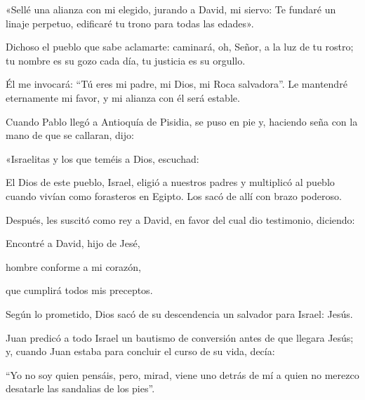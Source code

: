 		\begin{psbody}
			«Sellé una alianza con mi elegido,
			jurando a David, mi siervo:
			Te fundaré un linaje perpetuo,
			edificaré tu trono para todas las edades». 
			
			Dichoso el pueblo que sabe aclamarte:
			caminará, oh, Señor, a la luz de tu rostro;
			tu nombre es su gozo cada día,
			tu justicia es su orgullo.

			Él me invocará: ``Tú eres mi padre,
			mi Dios, mi Roca salvadora''.
			Le mantendré eternamente mi favor,
			y mi alianza con él será estable.
		\end{psbody}
	


		 

		
		\begin{scripture}
			Cuando Pablo llegó a Antioquía de Pisidia, se puso en pie y, haciendo seña con la mano de que se callaran, dijo:
			
			«Israelitas y los que teméis a Dios, escuchad:
			
			El Dios de este pueblo, Israel, eligió a nuestros padres y multiplicó al pueblo cuando vivían como forasteros en Egipto. Los sacó de allí con brazo poderoso.
			
			Después, les suscitó como rey a David, en favor del cual dio testimonio, diciendo:
			
			Encontré a David, hijo de Jesé,
			
			hombre conforme a mi corazón,
			
			que cumplirá todos mis preceptos.
			
			Según lo prometido, Dios sacó de su descendencia un salvador para Israel: Jesús.
			
			Juan predicó a todo Israel un bautismo de conversión antes de que llegara Jesús; y, cuando Juan estaba para concluir el curso de su vida, decía:
			
			``Yo no soy quien pensáis, pero, mirad, viene uno detrás de mí a quien no merezco desatarle las sandalias de los pies''.
		\end{scripture}



		 

		
